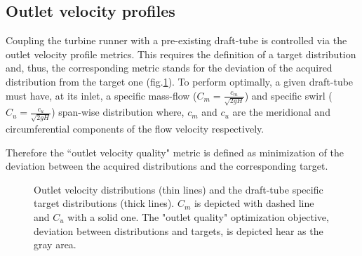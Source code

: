 \subsection{Outlet velocity profiles}
Coupling the turbine runner with a pre-existing draft-tube is controlled via the outlet velocity profile metrics. This requires the definition of a target distribution and, thus, the corresponding metric stands for the deviation of the acquired distribution from the target one (fig.\ref{design-obj2}). To perform optimally, a given draft-tube must have, at its inlet, a specific mass-flow ($C_m=\frac{c_m}{\sqrt{2gH}}$) and  specific swirl ($C_u=\frac{c_u}{\sqrt{2gH}}$) span-wise distribution where, $c_m$ and $c_u$ are the meridional and circumferential components of the flow velocity respectively.


Therefore the  ``outlet velocity quality" metric is defined as minimization of the deviation between the acquired distributions and the corresponding target. 

\begin{figure}[h!]
\begin{minipage}[b]{1\linewidth}
 \centering
\end{minipage}
\caption{Outlet velocity distributions (thin lines) and the draft-tube specific target distributions (thick lines). $C_m$ is depicted with dashed line and $C_u$ with a solid one. The "outlet quality" optimization objective, deviation between distributions and targets, is depicted hear as the gray area.}
\label{design-obj2}
\end{figure}

